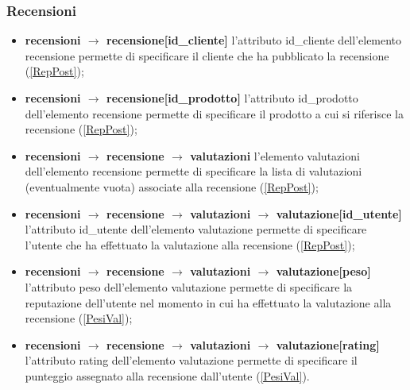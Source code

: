 \documentclass[a4paper, 14pt]{article}
\begin{document}
\begin{flushleft}
			\subsubsection{Recensioni} 
				\begin{itemize}
					\item \textbf{recensioni $\rightarrow$ recensione[id\_cliente] } l'attributo id\_cliente dell'elemento recensione permette di specificare il cliente che ha pubblicato la recensione (\ref{RepPost});
					\item \textbf{recensioni $\rightarrow$ recensione[id\_prodotto] } l'attributo id\_prodotto dell'elemento recensione permette di specificare il prodotto a cui si riferisce la recensione (\ref{RepPost});
					\item \textbf{recensioni $\rightarrow$ recensione $\rightarrow$ valutazioni } l'elemento valutazioni dell'elemento recensione permette di specificare la lista di valutazioni (eventualmente vuota) associate alla recensione (\ref{RepPost});
					\item \textbf{recensioni $\rightarrow$ recensione $\rightarrow$ valutazioni $\rightarrow$ valutazione[id\_utente]} l'attributo id\_utente dell'elemento valutazione permette di specificare l'utente che ha effettuato la valutazione alla recensione (\ref{RepPost});
					\item \textbf{recensioni $\rightarrow$ recensione $\rightarrow$ valutazioni $\rightarrow$ valutazione[peso]} l'attributo peso dell'elemento valutazione permette di specificare la reputazione dell'utente nel momento in cui ha effettuato la valutazione alla recensione (\ref{PesiVal});
					\item \textbf{recensioni $\rightarrow$ recensione $\rightarrow$ valutazioni $\rightarrow$ valutazione[rating]} l'attributo rating dell'elemento valutazione permette di specificare il punteggio assegnato alla recensione dall'utente (\ref{PesiVal}).			
				\end{itemize}
			\smallskip

\end{flushleft}
\end{document}
